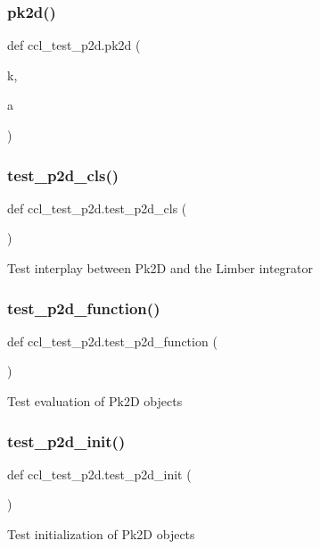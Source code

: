 \subsubsection{\texorpdfstring{pk2d()}{pk2d()}}
{\footnotesize\ttfamily def ccl\+\_\+test\+\_\+p2d.\+pk2d (\begin{DoxyParamCaption}\item[{}]{k,  }\item[{}]{a }\end{DoxyParamCaption})}

\mbox{\label{namespaceccl__test__p2d_a30d67d0cbda03ae987e45f966c5c2c88}} 
\subsubsection{\texorpdfstring{test\+\_\+p2d\+\_\+cls()}{test\_p2d\_cls()}}
{\footnotesize\ttfamily def ccl\+\_\+test\+\_\+p2d.\+test\+\_\+p2d\+\_\+cls (\begin{DoxyParamCaption}{ }\end{DoxyParamCaption})}

\begin{DoxyVerb}Test interplay between Pk2D and the Limber integrator
\end{DoxyVerb}
 \mbox{\label{namespaceccl__test__p2d_aaa50f135376935cbc064325a1a344c2b}} 
\subsubsection{\texorpdfstring{test\+\_\+p2d\+\_\+function()}{test\_p2d\_function()}}
{\footnotesize\ttfamily def ccl\+\_\+test\+\_\+p2d.\+test\+\_\+p2d\+\_\+function (\begin{DoxyParamCaption}{ }\end{DoxyParamCaption})}

\begin{DoxyVerb}Test evaluation of Pk2D objects
\end{DoxyVerb}
 \mbox{\label{namespaceccl__test__p2d_acca2740a4f8fe77b3c2deffa35829164}} 
\subsubsection{\texorpdfstring{test\+\_\+p2d\+\_\+init()}{test\_p2d\_init()}}
{\footnotesize\ttfamily def ccl\+\_\+test\+\_\+p2d.\+test\+\_\+p2d\+\_\+init (\begin{DoxyParamCaption}{ }\end{DoxyParamCaption})}

\begin{DoxyVerb}Test initialization of Pk2D objects
\end{DoxyVerb}
 
